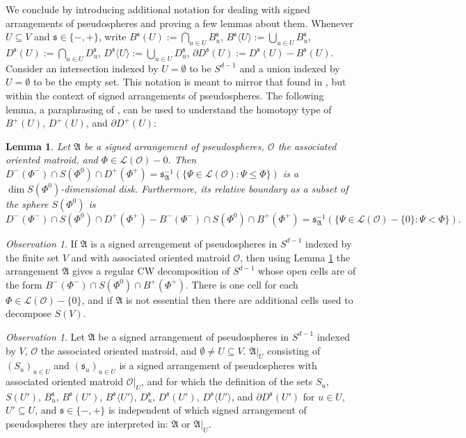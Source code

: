 \documentclass[a4paper,11pt,reqno, english]{amsart}
\newtheorem{lemma}[theorem]{Lemma}
\theoremstyle{definition}
\theoremstyle{remark}
\newtheorem{observation}[theorem]{Observation}
\begin{document}
We conclude by introducing additional notation for dealing with signed arrangements of pseudospheres and proving a few lemmas about them. Whenever $U\subseteq V$ and $\mathfrak{s}\in\{-,+\}$, write $B^\mathfrak{s}(U):=\bigcap_{u\in U}B^\mathfrak{s}_u$, $B^\mathfrak{s}\langle U\rangle:=\bigcup_{u\in U}B^\mathfrak{s}_u$, $D^\mathfrak{s}(U):=\bigcap_{u\in U}D^\mathfrak{s}_u$, $D^\mathfrak{s}\langle U\rangle:=\bigcup_{u\in U}D^\mathfrak{s}_u$, $\partial D^\mathfrak{s}(U):=D^\mathfrak{s}(U)-B^\mathfrak{s}(U)$. Consider an intersection indexed by $U=\emptyset$ to be $S^{d-1}$ and a union indexed by $U=\emptyset$ to be the empty set. This notation is meant to mirror that found in \cite{Blagojevic2025}, but within the context of signed arrangements of pseudospheres. The following lemma, a paraphrasing of \cite[Lemma 5.1.8]{OrientedMatroids}, can be used to understand the homotopy type of $B^+(U)$, $D^+(U)$, and $\partial D^+(U)$:
\begin{lemma}\label{lem:disks-in-oms}
    Let $\mathfrak{A}$ be a signed arrangement of pseudospheres, $\mathscr{O}$ the associated oriented matroid, and $\Phi\in\mathscr{L}(\mathscr{O})-{0}$. Then  $D^-(\Phi^-)\cap S(\Phi^0)\cap D^+(\Phi^+)=\mathfrak{s}_\mathfrak{A}^{-1}(\{\Psi\in\mathscr{L}(\mathscr{O}):\Psi\leq\Phi\})$ is a $\dim S(\Phi^0)$-dimensional disk. Furthermore, its relative boundary as a subset of the sphere $S(\Phi^0)$ is 
    \[
        D^-(\Phi^-)\cap S(\Phi^0)\cap D^+(\Phi^+)-B^-(\Phi^-)\cap S(\Phi^0)\cap B^+(\Phi^+)=\mathfrak{s}_\mathfrak{A}^{-1}(\{\Psi\in\mathscr{L}(\mathscr{O})-\{0\}:\Psi<\Phi\}).
    \] 
\end{lemma}
\begin{observation}\label{obs:pseudospheres-regular-cw}
    If $\mathfrak{A}$ is a signed arrengement of pseudospheres in $S^{d-1}$ indexed by the finite set $V$ and with associated oriented matroid $\mathscr{O}$, then using Lemma \ref{lem:disks-in-oms} the arrangement $\mathfrak{A}$ gives a regular CW decomposition of $S^{d-1}$ whose open cells are of the form $B^-(\Phi^-)\cap S(\Phi^0)\cap B^+(\Phi^+)$. There is one cell for each $\Phi\in\mathscr{L}(\mathscr{O})-\{0\}$, and if $\mathfrak{A}$ is not essential then there are additional cells used to decompose $S(V)$.
\end{observation}
\begin{observation}\label{obs:restriction-of-pseudosphere-arrangements}
    Let $\mathfrak{A}$ be a signed arrangement of pseudospheres in $S^{d-1}$ indexed by $V$, $\mathscr{O}$ the associated oriented matroid, and $\emptyset\neq U\subseteq V$. $\mathfrak{A}|_U$ consisting of $(S_u)_{u\in U}$ and $(\mathfrak{s}_u)_{u\in U}$ is a signed arrangement of pseudospheres with associated oriented matroid $\mathscr{O}|_U$, and for which the definition of the sets $S_u$, $S(U')$, $B^\mathfrak{s}_u$, $B^\mathfrak{s}(U')$, $B^\mathfrak{s}\langle U'\rangle$, $D^\mathfrak{s}_u$, $D^\mathfrak{s}(U')$, $D^\mathfrak{s}\langle U'\rangle$, and $\partial D^\mathfrak{s}(U')$ for $u\in U$, $U'\subseteq U$, and $\mathfrak{s}\in\{-,+\}$ is independent of which signed arrangement of pseudospheres they are interpreted in: $\mathfrak{A}$ or $\mathfrak{A}|_U$.
\end{observation}
\end{document}

